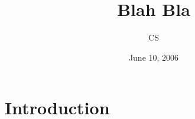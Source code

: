 \documentclass[12pt]{article}
\title{Blah Bla}
\author{CS}
\date{June 10, 2006}
\begin{document}
\maketitle

\section{Introduction}
\end{document}
